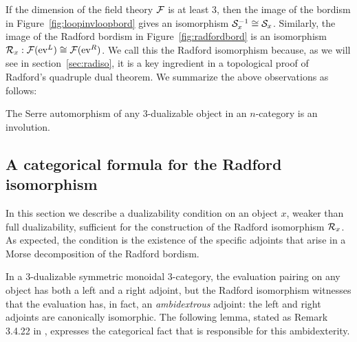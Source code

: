 \documentclass{amsart}
\begin{document}
If the dimension of the field theory $\mathcal F$ is at least 3, then the image of the bordism in Figure~\ref{fig:loopinvloopbord} gives an isomorphism $\mathcal S^{-1}_x \cong \mathcal S_x$.  Similarly, the image of the Radford bordism in Figure~\ref{fig:radfordbord} is an isomorphism $\mathcal R_x: \mathcal F(\mathrm{ev}^L) \cong \mathcal F(\mathrm{ev}^R)$.  We call this the Radford isomorphism because, as we will see in section~\ref{sec:radiso}, it is a key ingredient in a topological proof of Radford's quadruple dual theorem.
We summarize the above observations as follows:

\begin{proposition}
The Serre automorphism of any $3$-dualizable object in an $n$-category is an involution.
\end{proposition}



\subsection{A categorical formula for the Radford isomorphism} 

In this section we describe a dualizability condition on an object $x$, weaker than full dualizability, sufficient for the construction of the Radford isomorphism $\mathcal R_x$.  As expected, the condition is the existence of the specific adjoints that arise in a Morse decomposition of the Radford bordism.

In a 3-dualizable symmetric monoidal 3-category, the evaluation pairing on any object has both a left and a right adjoint, but the Radford isomorphism witnesses that the evaluation has, in fact, an {\em ambidextrous} adjoint: the left and right adjoints are canonically isomorphic.  The following lemma, stated as Remark 3.4.22 in \cite{lurie-ch}, expresses the categorical fact that is responsible for this ambidexterity.
\end{document}
